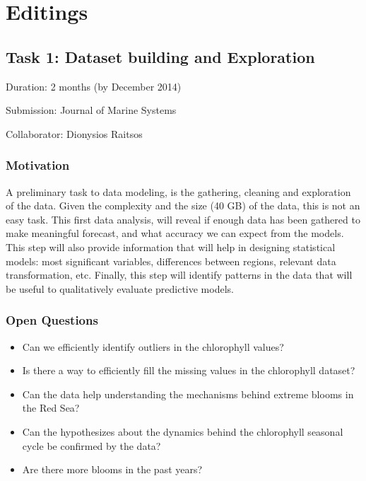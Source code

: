 

\chapter{Editings}
\label{chapter3}

\section{Task 1: Dataset building and Exploration}

Duration: 2 months (by December 2014)

Submission: Journal of Marine Systems

Collaborator: Dionysios Raitsos

\subsection{Motivation}

A preliminary task to data modeling, is the gathering, cleaning and exploration of the data. Given the complexity and the size (40 GB) of the data, this is not an easy task. This first data analysis, will reveal if enough data has been gathered to make meaningful forecast, and what accuracy we can expect from the models. This step will also provide information that will help in designing statistical models: most significant variables, differences between regions, relevant data transformation, etc. Finally, this step will identify patterns in the data that will be useful to qualitatively evaluate predictive models.

\subsection{Open Questions}

\begin{itemize}
\item Can we efficiently identify outliers in the chlorophyll values?
\item Is there a way to efficiently fill the missing values in the chlorophyll dataset?
\item Can the data help understanding the mechanisms behind extreme blooms in the Red Sea?
\item Can the hypothesizes about the dynamics behind the chlorophyll seasonal cycle be confirmed by the data?
\item Are there more blooms in the past years?
\end{itemize}

